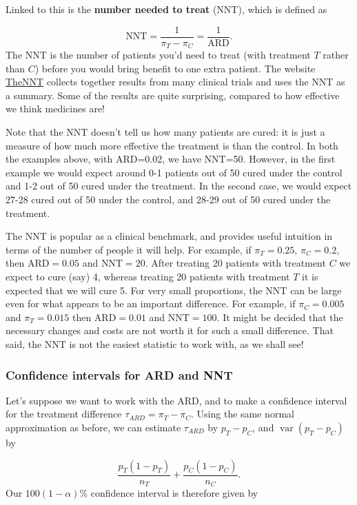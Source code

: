 \documentclass[
  openany]{book}
\theoremstyle{definition}
\theoremstyle{definition}
\theoremstyle{definition}
\theoremstyle{definition}
\theoremstyle{remark}
\begin{document}
Linked to this is the \textbf{number needed to treat} (NNT), which is defined as

\[ \text{NNT} = \frac{1}{\pi_T - \pi_C} = \frac{1}{\text{ARD}}. \]
The NNT is the number of patients you'd need to treat (with treatment \(T\) rather than \(C\)) before you would bring benefit to one extra patient. The website \href{https://thennt.com/}{TheNNT} collects together results from many clinical trials and uses the NNT as a summary. Some of the results are quite surprising, compared to how effective we think medicines are!

{Note that the NNT doesn't tell us how many patients are cured: it is just a measure of how much more effective the treatment is than the control. In both the examples above, with ARD=0.02, we have NNT=50. However, in the first example we would expect around 0-1 patients out of 50 cured under the control and 1-2 out of 50 cured under the treatment. In the second case, we would expect 27-28 cured out of 50 under the control, and 28-29 out of 50 cured under the treatment.}

The NNT is popular as a clinical benchmark, and provides useful intuition in terms of the number of people it will help. For example, if \(\pi_T = 0.25,\,\pi_C=0.2\), then \(\text{ARD} = 0.05\) and \(\text{NNT} = 20.\) After treating 20 patients with treatment \(C\) we expect to cure (say) 4, whereas treating 20 patients with treatment \(T\) it is expected that we will cure 5. For very small proportions, the NNT can be large even for what appears to be an important difference. For example, if \(\pi_C=0.005\) and \(\pi_T = 0.015\) then \(\text{ARD}=0.01\) and \(\text{NNT}=100\). It might be decided that the necessary changes and costs are not worth it for such a small difference. That said, the NNT is not the easiest statistic to work with, as we shall see!

\hypertarget{confint-ardnnt}{%
\subsubsection{Confidence intervals for ARD and NNT}\label{confint-ardnnt}}

Let's suppose we want to work with the ARD, and to make a confidence interval for the treatment difference \(\tau_{ARD} = \pi_T - \pi_C\). Using the same normal approximation as before, we can estimate \(\tau_{ARD}\) by \(p_T - p_C\), and \(\operatorname{var}\left(p_T - p_C\right)\) by

\[ \frac{p_T\left(1-p_T\right)}{n_T} + \frac{p_C\left(1-p_C\right)}{n_C}.\]
Our \(100\left(1-\alpha\right)\)\% confidence interval is therefore given by
\end{document}
